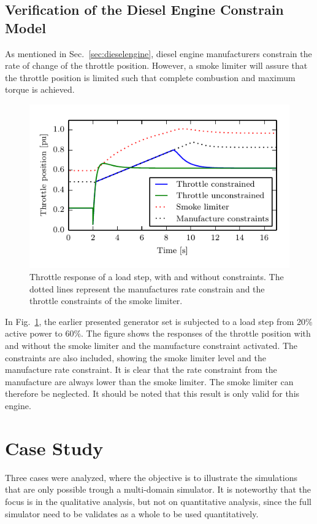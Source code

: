 \documentclass[journal]{IEEEtran}
\begin{document}
\subsection{Verification of the Diesel Engine Constrain Model}
\label{sec:dieselconstraints}
As mentioned in Sec.~\ref{sec:dieselengine}, diesel engine manufacturers constrain the rate of change of the throttle position.
However, a smoke limiter will assure that the throttle position is limited such that complete combustion and maximum torque is achieved.

\begin{figure}
	\includegraphics[width=\columnwidth]{figures/withDeadBand}
	\caption{Throttle response of a load step, with and without constraints. The dotted lines represent the manufactures rate constrain and the throttle constraints of the smoke limiter.}
	\label{fig:rateconstrain}
\end{figure}

In Fig.~\ref{fig:rateconstrain}, the earlier presented generator set is subjected to a load step from 20\% active power to 60\%.
The figure shows the responses of the throttle position with and without the smoke limiter and the manufacture constraint activated.
The constraints are also included, showing the smoke limiter level and the manufacture rate constraint.
It is clear that the rate constraint from the manufacture are always lower than the smoke limiter. The smoke limiter can therefore be neglected. 
It should be noted that this result is only valid for this engine.

\section{Case Study}
\label{sec:caseStudy}
Three cases were analyzed, where the objective is to illustrate the simulations that are only possible trough a multi-domain simulator. It is noteworthy that the focus is in the qualitative analysis, but not on quantitative analysis, since the full simulator need to be validates as a whole to be used quantitatively.
\end{document}
